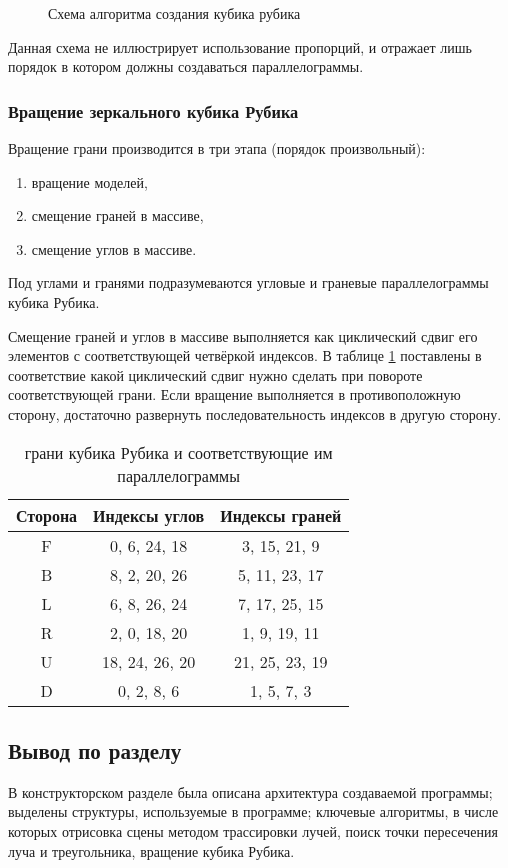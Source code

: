 \begin{figure}[!ht]
	\caption{Схема алгоритма создания кубика рубика}
	\label{fig:rubicks_create}
\end{figure}

Данная схема не иллюстрирует использование пропорций, и отражает лишь порядок в котором должны создаваться параллелограммы.

\subsubsection{Вращение зеркального кубика Рубика}

Вращение грани производится в три этапа (порядок произвольный):
\begin{enumerate}
	\item вращение моделей,
	\item смещение граней в массиве,
	\item смещение углов в массиве.
\end{enumerate}

Под углами и гранями подразумеваются угловые и граневые параллелограммы кубика Рубика.

Смещение граней и углов в массиве выполняется как циклический сдвиг его элементов с соответствующей четвёркой индексов. В таблице \ref{tabular:cube_indexes} поставлены в соответствие какой циклический сдвиг нужно сделать при повороте соответствующей грани. Если вращение выполняется в противоположную сторону, достаточно развернуть последовательность индексов в другую сторону.

\begin{table}
	\centering
	\caption{грани кубика Рубика и соответствующие им параллелограммы}
	\label{tabular:cube_indexes}
	\begin{tabular}{|c|c|c|}
		\hline
		Сторона & Индексы углов & Индексы граней \\
		\hline
		\hline
		F & 0, 6, 24, 18	& 3, 15, 21, 9		\\ \hline
		B & 8, 2, 20, 26	& 5, 11, 23, 17		\\ \hline
		L & 6, 8, 26, 24	& 7, 17, 25, 15		\\ \hline
		R & 2, 0, 18, 20	& 1, 9, 19, 11		\\ \hline
		U & 18, 24, 26, 20	& 21, 25, 23, 19	\\ \hline
		D & 0, 2, 8, 6		& 1, 5, 7, 3		\\ \hline
	\end{tabular}
\end{table}

\subsection{Вывод по разделу}
В конструкторском разделе была описана архитектура создаваемой программы;
выделены структуры, используемые в программе;
ключевые алгоритмы, в числе которых отрисовка сцены методом трассировки лучей,
поиск точки пересечения луча и треугольника, вращение кубика Рубика.

